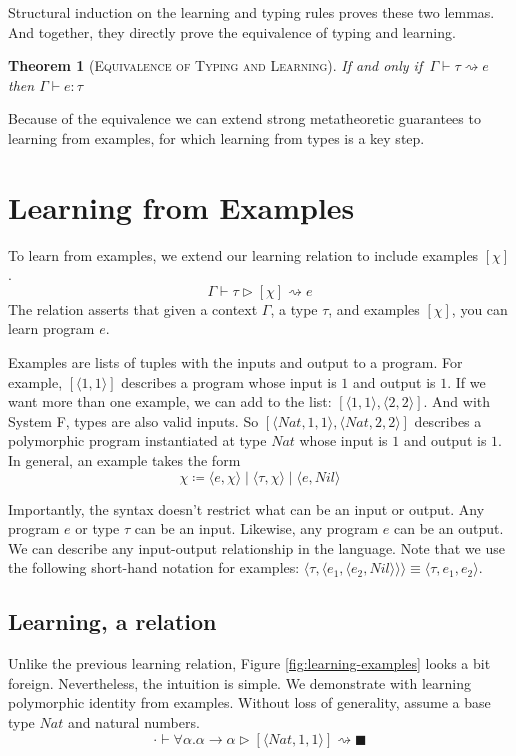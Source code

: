 \documentclass[sigplan,10pt]{acmart}
\theoremstyle{mytheoremstyle}
\newtheorem{theorem}{Theorem}[section]
\begin{document}
Structural induction on the learning and typing rules proves these two lemmas. And together, they directly prove the equivalence of typing and learning.

\begin{theorem}[\textsc{Equivalence of Typing and Learning}]
If and only if $\,\Gamma \vdash \tau \rightsquigarrow e$ then $\Gamma \vdash e : \tau$
\label{equivalence-learning}
\end{theorem}

Because of the equivalence we can extend strong metatheoretic guarantees to learning from examples, for which learning from types is a key step.

\section{Learning from Examples}
To learn from examples, we extend our learning relation to include examples $[\chi]$.
$$\Gamma \vdash \tau \rhd [\chi] \rightsquigarrow e$$
The relation asserts that given a context $\Gamma$, a type $\tau$, and examples $[\chi]$, you can learn program $e$.

Examples are lists of tuples with the inputs and output to a program. For example, $[\langle 1,1\rangle]$ describes a program whose input is $1$ and output is $1$. If we want more than one example, we can add to the list: $[\langle 1, 1\rangle, \langle 2,2 \rangle]$. And with System F, types are also valid inputs. So $[\langle Nat,1,1\rangle, \langle Nat,2,2\rangle]$ describes a polymorphic program instantiated at type $Nat$ whose input is $1$ and output is $1$. In general, an example takes the form
$$ \chi \coloneqq \langle e, \chi\rangle \mid \langle \tau, \chi\rangle \mid \langle e,Nil\rangle$$

Importantly, the syntax doesn't restrict what can be an input or output. Any program $e$ or type $\tau$ can be an input. Likewise, any program $e$ can be an output. We can describe any input-output relationship in the language. Note that we use the following short-hand notation for examples: $\langle\tau,\langle e_1, \langle e_2, Nil\rangle\rangle\rangle \equiv \langle \tau, e_1, e_2\rangle$.

\subsection{Learning, a relation}

Unlike the previous learning relation, Figure \ref{fig:learning-examples} looks a bit foreign. Nevertheless, the intuition is simple. We demonstrate with learning polymorphic identity from examples. Without loss of generality, assume a base type $Nat$ and natural numbers.
$$\cdot \vdash \forall\alpha.\alpha \!\to\! \alpha \rhd [\langle Nat,1,1\rangle] \rightsquigarrow \blacksquare$$
\end{document}
